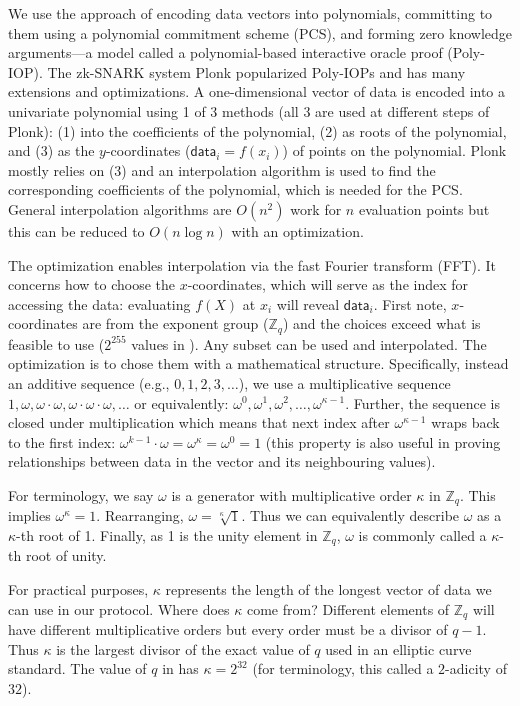 We use the approach of encoding data vectors into polynomials, committing to them using a polynomial commitment scheme (PCS), and forming zero knowledge arguments---a model called a polynomial-based interactive oracle proof (Poly-IOP). The zk-SNARK system Plonk popularized Poly-IOPs and has many extensions and optimizations. A one-dimensional vector of data is encoded into a univariate polynomial using 1 of 3 methods (all 3 are used at different steps of Plonk): (1) into the coefficients of the polynomial, (2) as roots of the polynomial, and (3) as the \(y\)-coordinates (\(\mathsf{data}_i=f(x_i)\)) of points on the polynomial. Plonk mostly relies on (3) and an interpolation algorithm is used to find the corresponding coefficients of the polynomial, which is
needed for the PCS. General interpolation algorithms are \(O(n^2)\) work for \(n\) evaluation points but this can be reduced to \(O(n\log n)\) with an optimization.

The optimization enables interpolation via the fast Fourier transform (FFT). It concerns how to choose the \(x\)-coordinates, which will serve as the index for accessing the data: evaluating \(f(X)\) at \(x_i\) will reveal \(\mathsf{data}_i\). First note, \(x\)-coordinates are from the exponent group (\(\mathbb{Z}_q\)) and the choices exceed what is feasible to use (\(2^{255}\) values in \bls). Any subset can be used and interpolated. The optimization is to chose them with a mathematical structure. Specifically, instead an additive sequence (e.g., \(0,1,2,3,\ldots\)), we use a multiplicative sequence
\(1,\omega,\omega\cdot\omega,\omega\cdot\omega\cdot\omega,\ldots\) or equivalently: \(\omega^0,\omega^1,\omega^2,\ldots,\omega^{\kappa-1}\). Further, the sequence is closed under multiplication which means that next index after \(\omega^{\kappa-1}\) wraps back to the first index: \(\omega^{k-1} \cdot \omega = \omega^\kappa = \omega^0=1\) (this property is also useful in proving relationships between data in the vector and its neighbouring values).

For terminology, we say \(\omega\) is a generator with multiplicative order \(\kappa\) in \(\mathbb{Z}_q\). This implies \(\omega^\kappa=1\). Rearranging, \(\omega=\sqrt[\kappa]{1}\). Thus we can equivalently describe \(\omega\) as a \(\kappa\)-th root of 1. Finally, as 1 is the unity element in \(\mathbb{Z}_q\), \(\omega\) is commonly called a \(\kappa\)-th root of unity.

For practical purposes, \(\kappa\) represents the length of the longest vector of data we can use in our protocol. Where does \(\kappa\) come from? Different elements of \(\mathbb{Z}_q\) will have different multiplicative orders but every order must be a divisor of \(q-1\). Thus \(\kappa\) is the largest divisor of the exact value of \(q\) used in an elliptic curve standard. The value of $q$ in \bls has \(\kappa=2^{32}\) (for terminology, this called a \(2\)-adicity of \(32\)).

